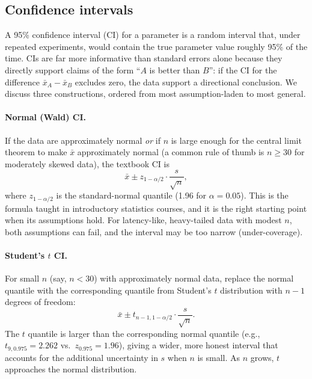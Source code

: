 \documentclass[11pt]{article}
\begin{document}
\subsection{Confidence intervals}
\label{sec:ci}

A 95\% confidence interval (CI) for a parameter is a random interval that, under repeated experiments, would contain the true parameter value roughly 95\% of the time. CIs are far more informative than standard errors alone because they directly support claims of the form ``$A$ is better than $B$'': if the CI for the difference $\bar{x}_A - \bar{x}_B$ excludes zero, the data support a directional conclusion. We discuss three constructions, ordered from most assumption-laden to most general.

\paragraph{Normal (Wald) CI.} If the data are approximately normal \emph{or} if $n$ is large enough for the central limit theorem to make $\bar{x}$ approximately normal (a common rule of thumb is $n \geq 30$ for moderately skewed data), the textbook CI is
\begin{equation}
\bar{x} \pm z_{1-\alpha/2} \cdot \frac{s}{\sqrt{n}},
\label{eq:wald}
\end{equation}
where $z_{1-\alpha/2}$ is the standard-normal quantile (1.96 for $\alpha = 0.05$). This is the formula taught in introductory statistics courses, and it is the right starting point when its assumptions hold. For latency-like, heavy-tailed data with modest $n$, both assumptions can fail, and the interval may be too narrow (under-coverage).

\paragraph{Student's $t$ CI.} For small $n$ (say, $n < 30$) with approximately normal data, replace the normal quantile with the corresponding quantile from Student's $t$ distribution with $n-1$ degrees of freedom:
\begin{equation}
\bar{x} \pm t_{n-1, 1-\alpha/2} \cdot \frac{s}{\sqrt{n}}.
\label{eq:tci}
\end{equation}
The $t$ quantile is larger than the corresponding normal quantile (e.g., $t_{9, 0.975} = 2.262$ vs.\ $z_{0.975} = 1.96$), giving a wider, more honest interval that accounts for the additional uncertainty in $s$ when $n$ is small. As $n$ grows, $t$ approaches the normal distribution.
\end{document}
